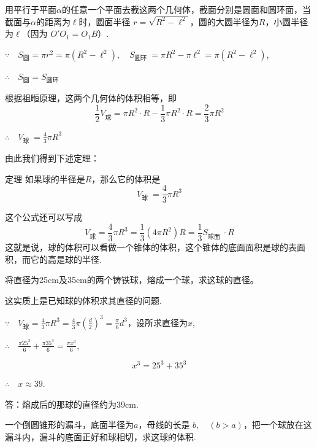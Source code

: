 用平行于平面$\alpha$的任意一个平面去截这两个几何体，截面分别是圆面和圆环面，当截面与$\alpha$的距离为$\ell$时，圆面半径 $r=\sqrt{R^{2}-\ell^{2}}$，圆的大圆半径为$R$，小圆半径为$\ell$（因为 $O'O_{1}=O_{1}B$）.

$\because\quad S_{\text{圆}}=\pi r^{2}=\pi \left(R^{2}-\ell^{2}\right),\quad 
S_{\text{圆环 }}=\pi  R^{2}-\pi \ell^{2}=\pi \left(R^{2}-\ell^{2}\right)$,

$\therefore\quad  S_{\text{圆}}=S_{\text{圆环}}$

根据祖暅原理，这两个几何体的体积相等，即
\[
\frac{1}{2}V_{\text{球} }=\pi R^{2}\cdot  R-\frac{1}{3}\pi R^{2}\cdot  R=\frac{2}{3}\pi R^{2}\]

$\therefore\quad V_{\text{球 }}=\frac{4}{3}\pi R^{3}$

由此我们得到下述定理：
\begin{thm}
{定理} 如果球的半径是$R$，那么它的体积是
\[V_{\text{球 }}=\frac{4}{3}\pi R^{3}\]    
\end{thm}


这个公式还可以写成
\[
V_{\text{球}}=\frac{4}{3}\pi  R^{3}=\frac{1}{3}\left(4\pi R^{2}\right)R=\frac{1}{3}S_{\text{球面 }}\cdot  R\]
这就是说，球的体积可以看做一个锥体的体积，这个锥体的底面面积是球的表面积，而它的高是球的半径.

\begin{example}
    将直径为25cm及35cm的两个铸铁球，熔成一个球，求这球的直径。
\end{example}

\begin{analyze}
    这实质上是已知球的体积求其直径的问题.
\end{analyze}

\begin{solution}
$\because\quad V_{\text{球} }=\frac{4}{3}\pi R^{3}=\frac{4}{3}\pi \left(\frac{d}{2}\right)^{3}=\frac{\pi }{6}d^{3}$，设所求直径为$x$,

$\therefore\quad \frac{\pi 25^{3}}{6}+\frac{\pi 35^{3}}{6}=\frac{\pi x^{3}}{6}$,

\[x^{3}=25^{3}+35^{3}\]

$\therefore\quad x\approx 39$.

答：熔成后的那球的直径约为39cm.
\end{solution}

\begin{example}
    一个倒圆锥形的漏斗，底面半径为$a$，母线的长是 $b,\quad (b>a)$，把一个球放在这漏斗内，漏斗的底面正好和球相切，求这球的体积.
\end{example}

